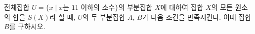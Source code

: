 전체집합 $U=\{x \mid x$는 $11$ 이하의 소수$\}$의 부분집합 $X$에 대하여 집합 $X$의 모든 원소의 합을 $S(X)$라 할 때, $U$의 두 부분집합 $A$, $B$가 다음 조건을 만족시킨다. 이때 집합 $B$를 구하시오.  
